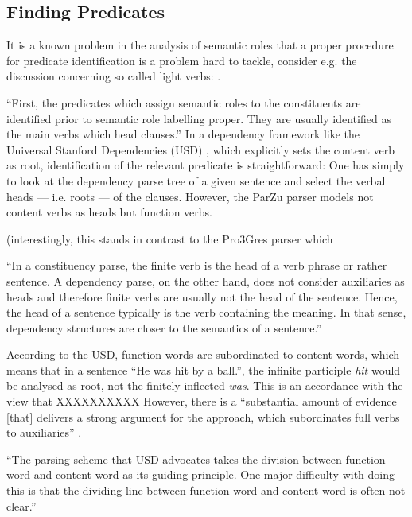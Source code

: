 \subsection{Finding Predicates}

It is a known problem in the analysis of semantic roles that a proper procedure for predicate
identification is a problem hard to tackle, consider e.g. the discussion concerning so called
light verbs: \cite{wittenberg2016light}.

``First, the predicates which assign semantic roles to the constituents are identified prior
to semantic role labelling proper. They are usually identified as the main verbs which head
clauses.'' \citep[p.~74]{samardzic2013dynamics} In a dependency framework like the Universal
Stanford Dependencies (USD) \citep{de2014universal}, which explicitly sets the content
verb as root, identification of the relevant predicate is straightforward: One has simply
to look at the dependency parse tree of a given sentence and select the verbal heads ---
i.e. roots --- of the clauses.  However, the ParZu parser models not content verbs as heads
but function verbs.

(interestingly, this stands in contrast to the Pro3Gres parser \citep{schneider2008hybrid} which

``In a constituency parse, the finite verb is the head of a verb phrase or rather sentence.
A dependency parse, on the other hand, does not consider auxiliaries as heads and therefore
finite verbs are usually not the head of the sentence.  Hence, the head of a sentence typically
is the verb containing the meaning.  In that sense, dependency structures are closer to the
semantics of a sentence.'' \citep[p.~6f.]{aepli2018parsing}

According to the USD, function words are subordinated to content words, which means that
in a sentence ``He was hit by a ball.'', the infinite participle \textit{hit} would be
analysed as root, not the finitely inflected \textit{was}.  This is an accordance with the
view that XXXXXXXXXX However, there is a ``substantial amount of evidence [that] delivers a
strong argument for the \textelp{} approach, which subordinates full verbs to auxiliaries''
\cite{gross2015dependency}.

``The parsing scheme that USD advocates takes the division between function word and content
word as its guiding principle.  One major difficulty with doing this is that the dividing line
between function word and content word is often not clear.'' \cite{gross2015dependency}


